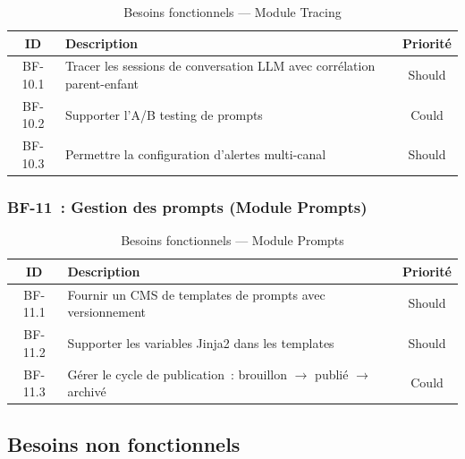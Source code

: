 \begin{table}[H]
\centering
\caption{Besoins fonctionnels --- Module Tracing}
\label{tab:bf_tracing}
\begin{tabularx}{\textwidth}{|c|X|c|}
\hline
\textbf{ID} & \textbf{Description} & \textbf{Priorité} \\
\hline
BF-10.1 & Tracer les sessions de conversation LLM avec corrélation parent-enfant & Should \\
\hline
BF-10.2 & Supporter l'A/B testing de prompts & Could \\
\hline
BF-10.3 & Permettre la configuration d'alertes multi-canal & Should \\
\hline
\end{tabularx}
\end{table}

\subsubsection{BF-11~: Gestion des prompts (Module Prompts)}

\begin{table}[H]
\centering
\caption{Besoins fonctionnels --- Module Prompts}
\label{tab:bf_prompts}
\begin{tabularx}{\textwidth}{|c|X|c|}
\hline
\textbf{ID} & \textbf{Description} & \textbf{Priorité} \\
\hline
BF-11.1 & Fournir un CMS de templates de prompts avec versionnement & Should \\
\hline
BF-11.2 & Supporter les variables Jinja2 dans les templates & Should \\
\hline
BF-11.3 & Gérer le cycle de publication~: brouillon $\rightarrow$ publié $\rightarrow$ archivé & Could \\
\hline
\end{tabularx}
\end{table}


\subsection{Besoins non fonctionnels}

